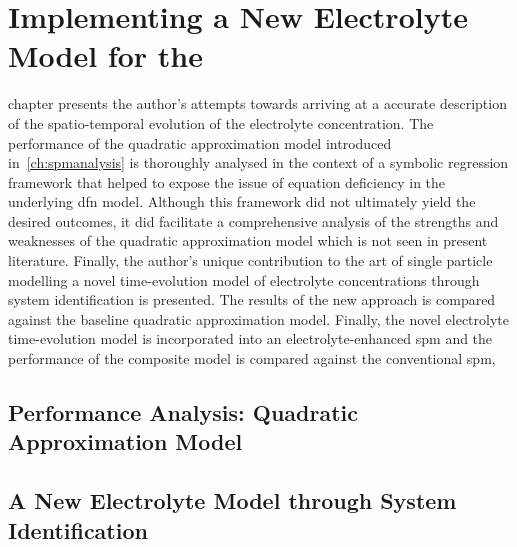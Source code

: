 
\clearpage
\chapter{Implementing a New Electrolyte Model for the }\label{ch:newelectrolytemodel}
\startcontents[chapters]

\graphicspath{{6/figures/}}

\bigskip

 chapter presents the author's attempts towards arriving at
a  accurate description  of  the spatio-temporal  evolution  of the  electrolyte
concentration. The  performance of the quadratic  approximation model introduced
in~\cref{ch:spmanalysis} is  thoroughly analysed  in the  context of  a symbolic
regression framework that  helped to expose the issue of  equation deficiency in
the underlying \gls{dfn} model. Although this framework did not ultimately yield
the  desired  outcomes,  it  did  facilitate a  comprehensive  analysis  of  the
strengths and weaknesses of the quadratic  approximation model which is not seen
in present literature.  Finally, the author's unique contribution to  the art of
single particle  modelling \viz{}  a novel  time-evolution model  of electrolyte
concentrations through  system identification is  presented. The results  of the
new approach  is compared  against the  baseline quadratic  approximation model.
Finally,  the novel  electrolyte time-evolution  model is  incorporated into  an
electrolyte-enhanced \gls{spm}  and the  performance of  the composite  model is
compared against the conventional \gls{spm},

\section{Performance Analysis: Quadratic Approximation Model}\label{sec:symbolicregression}



\section{A New Electrolyte Model through System Identification}\label{sec:newelectrolytemodel}

